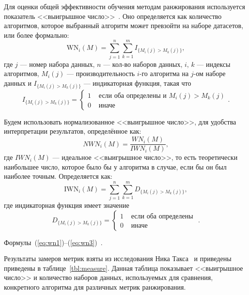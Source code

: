 Для оценки общей эффективности обучения методам ранжирования используется показатель <<выигрышное число>>~\cite{cmp}. Оно определяется как количество алгоритмов, которое выбранный алгоритм может превзойти на наборе датасетов, или более формально:
\begin{equation}
	\label{eq:wn1}
	\mathrm{WN}_i(M)=\sum_{j=1}^n \sum_{k=1}^m I_{\{M_i(j)>M_k(j)\}},
\end{equation}
где $j$ --- номер набора данных, $n$ --- кол-во наборов данных, $i$, $k$ --- индексы алгоритмов, $M_i(j)$ --- производительность $i$-го алгоритма на $j$-ом наборе данных и $I_{\{M_i(j)>M_k(j)\}}$ --- индикаторная функция, такая что
\[
I_{\{M_i(j)>M_k(j)\}}= \begin{cases}1 & \text { если оба определены и } M_i(j)>M_k(j) \\ 0 & \text { иначе }\end{cases}.
\]

Будем использовать нормализованное <<выигрышное число>>, для удобства интерпретации результатов, определённое как:
\begin{equation}
	\label{eq:wn2}
	NWN_i(M)=\frac{WN_i(M)}{IWN_i(M)},
\end{equation}
где $IWN_i(M)$ --- идеальное <<выигрышное число>>, то есть теоретически наибольшее число, которое было
бы у алгоритма в случае, если бы он был наиболее точным. Определяется как:
\begin{equation}
	\label{eq:wn3}
	\mathrm{IWN}_i(M)=\sum_{j=1}^n \sum_{k=1}^m D_{\{M_i(j)>M_k(j)\}},
\end{equation}
где индикаторная функция имеет значение
\[
D_{\{M_i(j)>M_k(j)\}}= \begin{cases}1 & \text { если оба определены } \\ 0 & \text { иначе }\end{cases}.
\]

Формулы~(\ref{eq:wn1})--(\ref{eq:wn3})~\cite{cmp}.

Результаты замеров метрик взяты из исследования Ника Такса~\cite{cmp} и приведены приведены в таблице~\ref{tbl:measure}. Данная таблица показывает <<выигрышное число>> и количество наборов данных, используемых для сравнения, конкретного алгоритма для различных метрик ранжирования.

